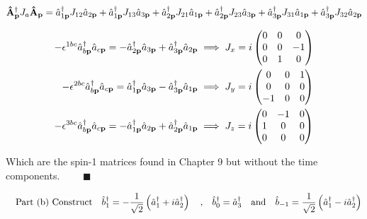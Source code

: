 \documentclass{article}
\begin{document}
\begin{align*}
  \vb{\hat{A}}^\dagger_{\vb{p}}J_a\vb{\hat{A}}_{\vb{p}} & =
  \hat{a}^\dagger_{1\vb{p}}J_{12}\hat{a}_{2\vb{p}} + \hat{a}^\dagger_{1\vb{p}}J_{13}\hat{a}_{3\vb{p}}
  +\hat{a}^\dagger_{2\vb{p}}J_{21}\hat{a}_{1\vb{p}} + \hat{a}^\dagger_{2\vb{p}}J_{23}\hat{a}_{3\vb{p}}
  +\hat{a}^\dagger_{3\vb{p}}J_{31}\hat{a}_{1\vb{p}} + \hat{a}^\dagger_{3\vb{p}}J_{32}\hat{a}_{2\vb{p}} \\
\end{align*}



\begin{align*}
  -\epsilon^{1bc}\hat{a}^\dagger_{b\vb{p}}\hat{a}_{c\vb{p}}  =-\hat{a}^\dagger_{2\vb{p}}\hat{a}_{3\vb{p}}+\hat{a}^\dagger_{3\vb{p}}\hat{a}_{2\vb{p}} & \implies J_x=i\begin{pmatrix}
    0 & 0 & 0  \\
    0 & 0 & -1 \\
    0 & 1 & 0  \\
  \end{pmatrix} \\
  -\epsilon^{2bc}\hat{a}^\dagger_{b\vb{p}}\hat{a}_{c\vb{p}}  =\hat{a}^\dagger_{1\vb{p}}\hat{a}_{3\vb{p}}-\hat{a}^\dagger_{3\vb{p}}\hat{a}_{1\vb{p}}  & \implies J_y=i\begin{pmatrix}
    0  & 0 & 1 \\
    0  & 0 & 0 \\
    -1 & 0 & 0 \\
  \end{pmatrix} \\
  -\epsilon^{3bc}\hat{a}^\dagger_{b\vb{p}}\hat{a}_{c\vb{p}}  =-\hat{a}^\dagger_{1\vb{p}}\hat{a}_{2\vb{p}}+\hat{a}^\dagger_{2\vb{p}}\hat{a}_{1\vb{p}} & \implies J_z=i\begin{pmatrix}
    0 & -1 & 0 \\
    1 & 0  & 0 \\
    0 & 0  & 0 \\
  \end{pmatrix} \\
\end{align*}

Which are the spin-1 matrices found in Chapter 9 but without the time components. $\qquad\blacksquare$

\[\qq{Part (b) Construct}\hat{b}^\dagger_1=-\frac{1}{\sqrt{2}}\left(\hat{a}^\dagger_1+i\hat{a}^\dagger_2\right)\qq{,}\hat{b}^\dagger_0=\hat{a}^\dagger_3\qq{and}\hat{b}_{-1}=\frac{1}{\sqrt{2}}\left(\hat{a}^\dagger_1-i\hat{a}^\dagger_2\right)\]
\end{document}
